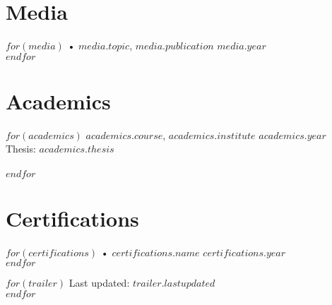 \documentclass[$fontsize$, a4paper]{article}
\begin{document}
\section*{Media}
$for(media)$
  • $media.topic$, \href{$media.url$}{$media.publication$} \hfill $media.year$\\
$endfor$

\section*{Academics}
$for(academics)$
  \textbf{$academics.course$}, \textbf{\href{$academics.url$}{$academics.institute$}} \hfill $academics.year$\\
  Thesis: \href{$academics.thesis_url$}{$academics.thesis$}\\
  \\[.05cm]
$endfor$

\section*{Certifications}
$for(certifications)$
  • \href{$certifications.url$}{$certifications.name$} \hfill $certifications.year$\\
$endfor$

\vspace{1cm}
$for(trailer)$
  Last updated: $trailer.lastupdated$\\
$endfor$
\end{document}
